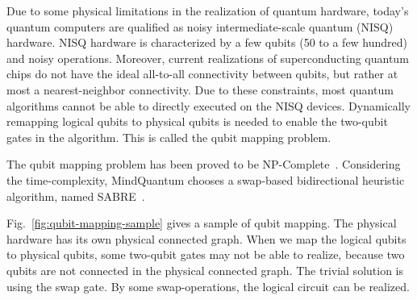 
Due to some physical limitations in the realization of quantum hardware, today's quantum computers are qualified as noisy intermediate-scale quantum (NISQ) hardware. NISQ hardware is characterized by a few qubits (50 to a few hundred) and noisy operations. Moreover, current realizations of superconducting quantum chips do not have the ideal all-to-all connectivity between qubits, but rather at most a nearest-neighbor connectivity. Due to these constraints, most quantum algorithms cannot be able to directly executed on the NISQ devices. Dynamically remapping logical qubits to physical qubits is needed to enable the two-qubit gates in the algorithm. This is called the qubit mapping problem.

The qubit mapping problem has been proved to be NP-Complete~\cite{siraichi2018qubit}. Considering the time-complexity, MindQuantum chooses a swap-based bidirectional heuristic algorithm, named SABRE~\cite{li2019tackling}.

Fig.~\ref{fig:qubit-mapping-sample} gives a sample of qubit mapping.
The physical hardware has its own physical connected graph. When we map the logical qubits to physical qubits, some two-qubit gates may not be able to realize, because two qubits are not connected in the physical connected graph. The trivial solution is using the swap gate. By some swap-operations, the logical circuit can be realized.

